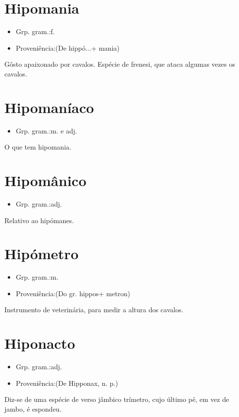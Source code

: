 \documentclass{article}
\begin{document}
\section{Hipomania}
\begin{itemize}
\item {Grp. gram.:f.}
\end{itemize}
\begin{itemize}
\item {Proveniência:(De \textunderscore hippó...\textunderscore  + \textunderscore mania\textunderscore )}
\end{itemize}
Gôsto apaixonado por cavalos.
Espécie de frenesi, que ataca algumas vezes os cavalos.
\section{Hipomaníaco}
\begin{itemize}
\item {Grp. gram.:m.  e  adj.}
\end{itemize}
O que tem hipomania.
\section{Hipomânico}
\begin{itemize}
\item {Grp. gram.:adj.}
\end{itemize}
Relativo ao hipómanes.
\section{Hipómetro}
\begin{itemize}
\item {Grp. gram.:m.}
\end{itemize}
\begin{itemize}
\item {Proveniência:(Do gr. \textunderscore hippos\textunderscore  + \textunderscore metron\textunderscore )}
\end{itemize}
Instrumento de veterinária, para medir a altura dos cavalos.
\section{Hiponacto}
\begin{itemize}
\item {Grp. gram.:adj.}
\end{itemize}
\begin{itemize}
\item {Proveniência:(De \textunderscore Hipponax\textunderscore , n. p.)}
\end{itemize}
Diz-se de uma espécie de verso jâmbico trímetro, cujo último pé, em vez de jambo, é espondeu.
\end{document}
